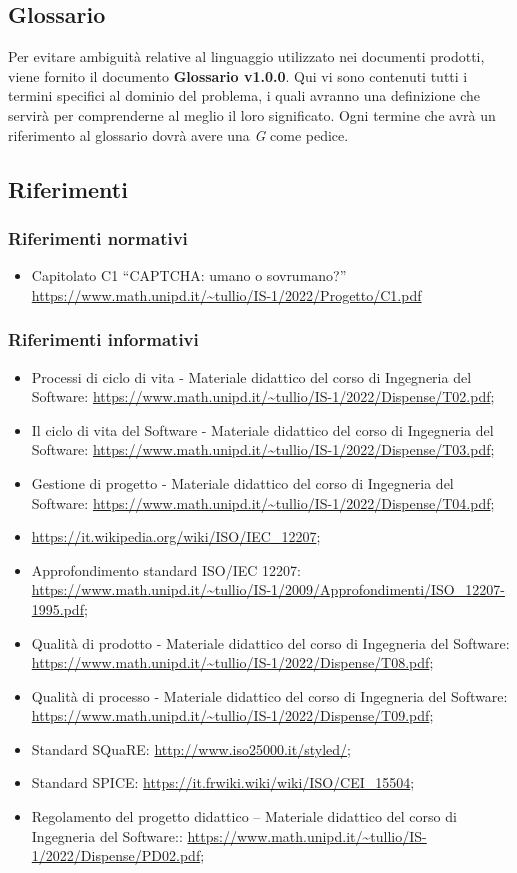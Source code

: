 \subsection{Glossario}
Per evitare ambiguità relative al linguaggio utilizzato nei documenti prodotti, viene fornito il documento \textbf{Glossario v1.0.0}. Qui vi sono contenuti tutti i termini specifici al dominio del problema, i quali avranno una definizione che servirà per comprenderne al meglio il loro significato. Ogni termine che avrà un riferimento al glossario dovrà avere una \textit{G} come pedice. 

\subsection{Riferimenti}

\subsubsection{Riferimenti normativi}
\begin{itemize}
	\item Capitolato C1 “CAPTCHA: umano o sovrumano?”
	\url{https://www.math.unipd.it/~tullio/IS-1/2022/Progetto/C1.pdf}
\end{itemize}

\subsubsection{Riferimenti informativi}
\begin{itemize}
	\item Processi di ciclo di vita - Materiale didattico del corso di Ingegneria del Software: \url{https://www.math.unipd.it/~tullio/IS-1/2022/Dispense/T02.pdf};
	\item Il ciclo di vita del Software - Materiale didattico del corso di Ingegneria del Software: \url{https://www.math.unipd.it/~tullio/IS-1/2022/Dispense/T03.pdf};
	\item Gestione di progetto - Materiale didattico del corso di Ingegneria del Software: \url{https://www.math.unipd.it/~tullio/IS-1/2022/Dispense/T04.pdf};
	\item \url{https://it.wikipedia.org/wiki/ISO/IEC_12207};
	\item Approfondimento standard ISO/IEC 12207:  \url{https://www.math.unipd.it/~tullio/IS-1/2009/Approfondimenti/ISO_12207-1995.pdf};
	\item Qualità di prodotto - Materiale didattico del corso di Ingegneria del Software: \url{https://www.math.unipd.it/~tullio/IS-1/2022/Dispense/T08.pdf};
	\item Qualità di processo - Materiale didattico del corso di Ingegneria del Software: \url{https://www.math.unipd.it/~tullio/IS-1/2022/Dispense/T09.pdf};
	\item Standard SQuaRE: \url{http://www.iso25000.it/styled/};
	\item Standard SPICE: \url{https://it.frwiki.wiki/wiki/ISO/CEI_15504};
	\item Regolamento del progetto didattico – Materiale didattico del corso di Ingegneria del Software::
	\url{https://www.math.unipd.it/~tullio/IS-1/2022/Dispense/PD02.pdf};
\end{itemize}
